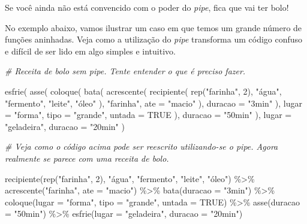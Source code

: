 \documentclass[
]{book}
\newenvironment{Shaded}{\begin{snugshade}}{\end{snugshade}}
\newcommand{\AttributeTok}[1]{\textcolor[rgb]{0.77,0.63,0.00}{#1}}
\newcommand{\CommentTok}[1]{\textcolor[rgb]{0.56,0.35,0.01}{\textit{#1}}}
\newcommand{\ConstantTok}[1]{\textcolor[rgb]{0.00,0.00,0.00}{#1}}
\newcommand{\DecValTok}[1]{\textcolor[rgb]{0.00,0.00,0.81}{#1}}
\newcommand{\FunctionTok}[1]{\textcolor[rgb]{0.00,0.00,0.00}{#1}}
\newcommand{\NormalTok}[1]{#1}
\newcommand{\SpecialCharTok}[1]{\textcolor[rgb]{0.00,0.00,0.00}{#1}}
\newcommand{\StringTok}[1]{\textcolor[rgb]{0.31,0.60,0.02}{#1}}
\begin{document}
Se você ainda não está convencido com o poder do \emph{pipe}, fica que vai ter bolo!

No exemplo abaixo, vamos ilustrar um caso em que temos um grande número de funções aninhadas. Veja como a utilização do \emph{pipe} transforma um código confuso e difícil de ser lido em algo simples e intuitivo.

\begin{Shaded}
\begin{Highlighting}[]
\CommentTok{\# Receita de bolo sem pipe. Tente entender o que é preciso fazer.}

\FunctionTok{esfrie}\NormalTok{(}
  \FunctionTok{asse}\NormalTok{(}
    \FunctionTok{coloque}\NormalTok{(}
      \FunctionTok{bata}\NormalTok{(}
        \FunctionTok{acrescente}\NormalTok{(}
          \FunctionTok{recipiente}\NormalTok{(}
            \FunctionTok{rep}\NormalTok{(}\StringTok{"farinha"}\NormalTok{, }\DecValTok{2}\NormalTok{), }
            \StringTok{"água"}\NormalTok{, }
            \StringTok{"fermento"}\NormalTok{, }
            \StringTok{"leite"}\NormalTok{, }
            \StringTok{"óleo"}
\NormalTok{          ), }
          \StringTok{"farinha"}\NormalTok{, }
          \AttributeTok{ate =} \StringTok{"macio"}
\NormalTok{        ), }
        \AttributeTok{duracao =} \StringTok{"3min"}
\NormalTok{      ), }
      \AttributeTok{lugar =} \StringTok{"forma"}\NormalTok{, }
      \AttributeTok{tipo =} \StringTok{"grande"}\NormalTok{, }
      \AttributeTok{untada =} \ConstantTok{TRUE}
\NormalTok{    ), }
    \AttributeTok{duracao =} \StringTok{"50min"}
\NormalTok{  ), }
  \AttributeTok{lugar =} \StringTok{"geladeira"}\NormalTok{, }
  \AttributeTok{duracao =} \StringTok{"20min"}
\NormalTok{)}


\CommentTok{\# Veja como o código acima pode ser reescrito utilizando{-}se o pipe. Agora realmente se parece com uma receita de bolo.}

\FunctionTok{recipiente}\NormalTok{(}\FunctionTok{rep}\NormalTok{(}\StringTok{"farinha"}\NormalTok{, }\DecValTok{2}\NormalTok{), }\StringTok{"água"}\NormalTok{, }\StringTok{"fermento"}\NormalTok{, }\StringTok{"leite"}\NormalTok{, }\StringTok{"óleo"}\NormalTok{) }\SpecialCharTok{\%\textgreater{}\%}
  \FunctionTok{acrescente}\NormalTok{(}\StringTok{"farinha"}\NormalTok{, }\AttributeTok{ate =} \StringTok{"macio"}\NormalTok{) }\SpecialCharTok{\%\textgreater{}\%}
  \FunctionTok{bata}\NormalTok{(}\AttributeTok{duracao =} \StringTok{"3min"}\NormalTok{) }\SpecialCharTok{\%\textgreater{}\%}
  \FunctionTok{coloque}\NormalTok{(}\AttributeTok{lugar =} \StringTok{"forma"}\NormalTok{, }\AttributeTok{tipo =} \StringTok{"grande"}\NormalTok{, }\AttributeTok{untada =} \ConstantTok{TRUE}\NormalTok{) }\SpecialCharTok{\%\textgreater{}\%}
  \FunctionTok{asse}\NormalTok{(}\AttributeTok{duracao =} \StringTok{"50min"}\NormalTok{) }\SpecialCharTok{\%\textgreater{}\%}
  \FunctionTok{esfrie}\NormalTok{(}\AttributeTok{lugar =} \StringTok{"geladeira"}\NormalTok{, }\AttributeTok{duracao =} \StringTok{"20min"}\NormalTok{)}
\end{Highlighting}
\end{Shaded}
\end{document}
